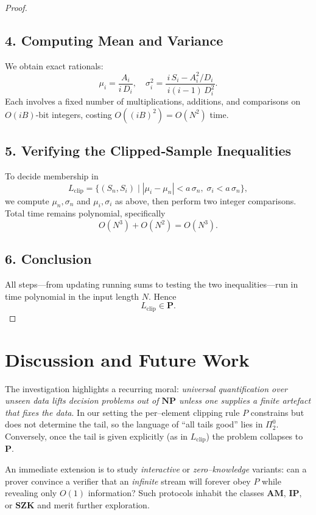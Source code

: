 \documentclass[12pt]{article}
\theoremstyle{definition}
\begin{document}
\begin{proof}
\subsection*{4. Computing Mean and Variance}

We obtain exact rationals:
\[
\mu_i = \frac{A_i}{i\,D_i},
\quad
\sigma_i^2 = \frac{i\,S_i - A_i^2/D_i}{\,i(i-1)\,D_i^2}.
\]
Each involves a fixed number of multiplications, additions, and comparisons on \(O(iB)\)-bit integers, costing \(O((iB)^2)=O(N^2)\) time.

\subsection*{5. Verifying the Clipped‐Sample Inequalities}

To decide membership in
\[
L_{\mathrm{clip}} = \{(S_n,S_i)\mid |\mu_i - \mu_n| < a\,\sigma_n,\;\sigma_i < a\,\sigma_n\},
\]
we compute \(\mu_n,\sigma_n\) and \(\mu_i,\sigma_i\) as above, then perform two integer comparisons.  Total time remains polynomial, specifically
\[
O(N^3) + O(N^2) = O(N^3).
\]

\subsection*{6. Conclusion}

All steps—from updating running sums to testing the two inequalities—run in time polynomial in the input length \(N\).  Hence
\[
L_{\mathrm{clip}} \in \mathbf{P}.
\]

\end{proof}

\section{Discussion and Future Work}
The investigation highlights a recurring moral: \emph{universal quantification over unseen data lifts decision problems out of $\mathbf{NP}$ unless one supplies a finite artefact that fixes the data}.  In our setting the per--element clipping rule $P$ constrains but does not determine the tail, so the language of ``all tails good'' lies in $\Pi^0_2$.  Conversely, once the tail is given explicitly (as in $L_{\mathrm{clip}}$) the problem collapses to $\mathbf P$.

An immediate extension is to study \emph{interactive} or \emph{zero--knowledge} variants: can a prover convince a verifier that an \emph{infinite} stream will forever obey $P$ while revealing only $O(1)$ information?  Such protocols inhabit the classes $\mathbf{AM}$, $\mathbf{IP}$, or $\mathbf{SZK}$ and merit further exploration.
\end{document}
